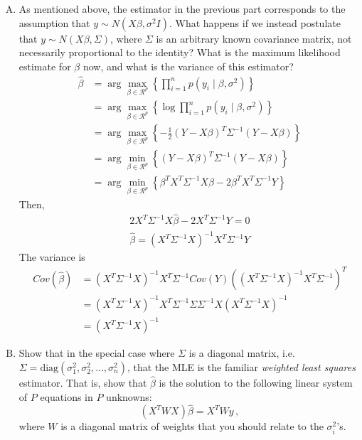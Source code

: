\documentclass[11pt]{article}
\begin{document}
\begin{enumerate}[(A)]
\bigskip

\item As mentioned above, the estimator in the previous part corresponds to the assumption that $y \sim N(X \beta, \sigma^2 I)$.  What happens if we instead postulate that $y \sim N(X \beta, \Sigma)$, where $\Sigma$ is an arbitrary known covariance matrix, not necessarily proportional to the identity?  What is the maximum likelihood estimate for $\beta$ now, and what is the variance of this estimator? 
\bigskip
\begin{align*}
    \hat{\beta} &= \arg \max_{\beta \in \mathcal{R}^p} \left\{ \prod_{i=1}^n p(y_i \mid \beta, \sigma^2) \right\} \\
    &= \arg \max_{\beta \in \mathcal{R}^p} \left\{ \log \prod_{i=1}^n p(y_i \mid \beta, \sigma^2) \right\} \\
    &= \arg \max_{\beta \in \mathcal{R}^p} \left\{ -\frac{1}{2} (Y-X\beta)^T\Sigma^{-1}(Y-X\beta) \right\} \\
    &= \arg \min_{\beta \in \mathcal{R}^p} \left\{ (Y-X\beta)^T\Sigma^{-1}(Y-X\beta) \right\} \\
    &= \arg \min_{\beta \in \mathcal{R}^p} \left\{ \beta^TX^T\Sigma^{-1}X\beta - 2\beta^TX^T\Sigma^{-1}Y \right\} 
\end{align*}
Then,
\begin{align*}
    2X^T\Sigma^{-1}X\hat{\beta} - 2X^T\Sigma^{-1}Y = 0 \\
    \hat{\beta} = (X^T\Sigma^{-1}X)^{-1} X^T\Sigma^{-1}Y
\end{align*}
The variance is
\begin{align*}
    Cov(\hat{\beta}) &= (X^T\Sigma^{-1}X)^{-1} X^T\Sigma^{-1} Cov(Y) ((X^T\Sigma^{-1}X)^{-1} X^T\Sigma^{-1})^T \\
    &= (X^T\Sigma^{-1}X)^{-1} X^T\Sigma^{-1} \Sigma \Sigma^{-1}X (X^T\Sigma^{-1}X)^{-1} \\
    &= (X^T\Sigma^{-1}X)^{-1}
\end{align*}


\item Show that in the special case where $\Sigma$ is a diagonal matrix, i.e. $\Sigma = \mbox{diag}(\sigma_1^2, \sigma_2^2, \ldots, \sigma_n^2)$, that the MLE is the familiar \emph{weighted least squares} estimator.  That is, show that $\hat \beta$ is the solution to the following linear system of $P$ equations in $P$ unknowns:
$$
(X^T W X) \hat \beta = X^T W y \, ,
$$
where $W$ is a diagonal matrix of weights that you should relate to the $\sigma_i^2$'s.  


\end{enumerate}
\end{document}
